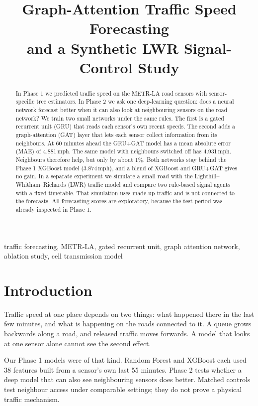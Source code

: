\documentclass[conference]{IEEEtran}
\title{Graph-Attention Traffic Speed Forecasting\\and a Synthetic LWR Signal-Control Study}
\author{\IEEEauthorblockN{Kavya Katal, Rudraksh Sharma, Anshuman Mehta, Vridhi Chaudhary, Bineet Keshari}
\IEEEauthorblockA{Team T072, Section C, Rishihood University\\
Project 4, Phase 2 (Deep Learning) report, November 2026}}
\begin{document}
\maketitle

\begin{abstract}
In Phase 1 we predicted traffic speed on the METR-LA road sensors with sensor-specific tree estimators. In Phase 2 we ask one deep-learning question: does a neural network forecast better when it can also look at neighbouring sensors on the road network? We train two small networks under the same rules. The first is a gated recurrent unit (GRU) that reads each sensor's own recent speeds. The second adds a graph-attention (GAT) layer that lets each sensor collect information from its neighbours. At 60 minutes ahead the GRU+GAT model has a mean absolute error (MAE) of 4.881\,mph. The same model with neighbours switched off has 4.931\,mph. Neighbours therefore help, but only by about 1\%. Both networks stay behind the Phase 1 XGBoost model (3.874\,mph), and a blend of XGBoost and GRU+GAT gives no gain. In a separate experiment we simulate a small road with the Lighthill--Whitham--Richards (LWR) traffic model and compare two rule-based signal agents with a fixed timetable. That simulation uses made-up traffic and is not connected to the forecasts. All forecasting scores are exploratory, because the test period was already inspected in Phase 1.
\end{abstract}

\begin{IEEEkeywords}
traffic forecasting, METR-LA, gated recurrent unit, graph attention network, ablation study, cell transmission model
\end{IEEEkeywords}

\section{Introduction}
Traffic speed at one place depends on two things: what happened there in the last few minutes, and what is happening on the roads connected to it. A queue grows backwards along a road, and released traffic moves forwards. A model that looks at one sensor alone cannot see the second effect.

Our Phase 1 models were of that kind. Random Forest and XGBoost each used 38 features built from a sensor's own last 55 minutes. Phase 2 tests whether a deep model that can also see neighbouring sensors does better. Matched controls test neighbour access under comparable settings; they do not prove a physical traffic mechanism.
\end{document}
